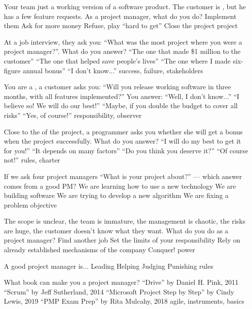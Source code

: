 \documentclass{article}
\begin{document}

\pmbaQuestion
  {Your team just  a working version of a software product. The customer is , but he has a few  feature requests. As a project manager, what do you do?}
  {Implement them}
  {Ask for more money}
  {Refuse, play ``hard to get''}
  {Close the project}
  {project}

\pmbaQuestion
  {At a job interview, they ask you: ``What was the most  project where you were a project manager?''. What do you answer?}
  {``The one that made \$1 million to the customer''}
  {``The one that helped save people's lives''}
  {``The one where I made six-figure annual bonus''}
  {``I don't know...''}
  {success, failure, stakeholders}

\pmbaQuestion
  {You are a , a customer asks you: ``Will you release working software in three months, with all features implemented?'' You answer:}
  {``Well, I don't know...''}
  {``I believe so! We will do our best!''}
  {``Maybe, if you double the budget to cover all risks''}
  {``Yes, of course!''}
  {responsibility, observer}

\pmbaQuestion
  {Close to the  of the project, a programmer asks you whether she will get a bonus when the project  successfully. What do you answer?}
  {``I will do my best to get it for you!''}
  {``It depends on many factors''}
  {``Do you think you deserve it?''}
  {``Of course not!''}
  {rules, charter}

\pmbaQuestion
  {If we ask four project managers ``What is your project about?'' --- which answer comes from a good PM?}
  {We are learning how to use a new technology}
  {We are building software}
  {We are trying to develop a new algorithm}
  {We are fixing a problem}
  {objective}

\pmbaQuestion
  {The scope is unclear, the team is immature, the management is chaotic, the risks are huge, the customer doesn't know what they want. What do you do as a project manager?}
  {Find another job}
  {Set the limits of your responsibility}
  {Rely on already established mechanisms of the company}
  {Conquer!}
  {power}

\pmbaQuestion
  {A good project manager is...}
  {Leading}
  {Helping}
  {Judging}
  {Punishing}
  {rules}

\pmbaQuestion
  {What book can make you a  project manager?}
  {``Drive'' by Daniel H. Pink, 2011}
  {``Scrum'' by Jeff Sutherland, 2014}
  {``Microsoft Project Step by Step'' by Cindy Lewis, 2019}
  {``PMP Exam Prep'' by Rita Mulcahy, 2018}
  {agile, instruments, basics}
\end{document}
